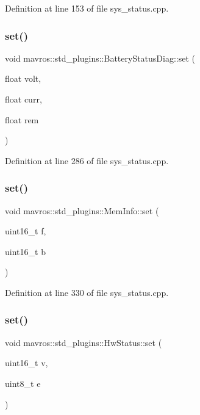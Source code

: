 Definition at line 153 of file sys\+\_\+status.\+cpp.

\mbox{\label{group__plugin_ga09ec2111cd2db38d3c68c2f0263dfc00}} 
\subsubsection{\texorpdfstring{set()}{set()}\hspace{0.1cm}{\footnotesize\ttfamily [2/4]}}
{\footnotesize\ttfamily void mavros\+::std\+\_\+plugins\+::\+Battery\+Status\+Diag\+::set (\begin{DoxyParamCaption}\item[{float}]{volt,  }\item[{float}]{curr,  }\item[{float}]{rem }\end{DoxyParamCaption})\hspace{0.3cm}{\ttfamily [inline]}}



Definition at line 286 of file sys\+\_\+status.\+cpp.

\mbox{\label{group__plugin_ga43594790e090ecc310c3dce79003bba5}} 
\subsubsection{\texorpdfstring{set()}{set()}\hspace{0.1cm}{\footnotesize\ttfamily [3/4]}}
{\footnotesize\ttfamily void mavros\+::std\+\_\+plugins\+::\+Mem\+Info\+::set (\begin{DoxyParamCaption}\item[{uint16\+\_\+t}]{f,  }\item[{uint16\+\_\+t}]{b }\end{DoxyParamCaption})\hspace{0.3cm}{\ttfamily [inline]}}



Definition at line 330 of file sys\+\_\+status.\+cpp.

\mbox{\label{group__plugin_ga8d117525ad76f5d494bf0ec2874d9fa2}} 
\subsubsection{\texorpdfstring{set()}{set()}\hspace{0.1cm}{\footnotesize\ttfamily [4/4]}}
{\footnotesize\ttfamily void mavros\+::std\+\_\+plugins\+::\+Hw\+Status\+::set (\begin{DoxyParamCaption}\item[{uint16\+\_\+t}]{v,  }\item[{uint8\+\_\+t}]{e }\end{DoxyParamCaption})\hspace{0.3cm}{\ttfamily [inline]}}



